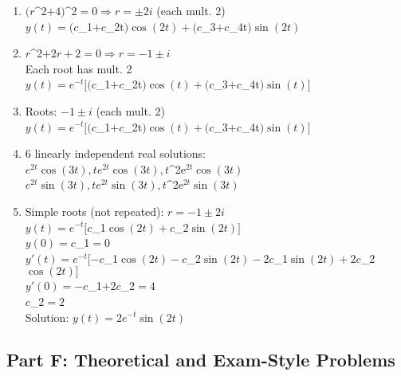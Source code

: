 \documentclass[12pt]{article}
\begin{document}
\begin{enumerate}[resume]
\item $(r$^{2}$ + 4)$^{2}$ = 0 \Rightarrow r = \pm 2i$ (each mult. 2)\\
$y(t) = (c$_{1}$ + c$_{2t}$)\cos(2t) + (c$_{3}$ + c$_{4t}$)\sin(2t)$

\item $r$^{2}$ + 2r + 2 = 0 \Rightarrow r = -1 \pm i$\\
Each root has mult. 2\\
$y(t) = e^{-t}[(c$_{1}$ + c$_{2t}$)\cos(t) + (c$_{3}$ + c$_{4t}$)\sin(t)]$

\item Roots: $-1 \pm i$ (each mult. 2)\\
$y(t) = e^{-t}[(c$_{1}$ + c$_{2t}$)\cos(t) + (c$_{3}$ + c$_{4t}$)\sin(t)]$

\item 6 linearly independent real solutions:\\
$e^{2t}\cos(3t), te^{2t}\cos(3t), t$^{2e}$^{2t}\cos(3t)$\\
$e^{2t}\sin(3t), te^{2t}\sin(3t), t$^{2e}$^{2t}\sin(3t)$

\item Simple roots (not repeated): $r = -1 \pm 2i$\\
$y(t) = e^{-t}[c$_{1}$\cos(2t) + c$_{2}$\sin(2t)]$\\
$y(0) = c$_{1}$ = 0$\\
$y'(t) = e^{-t}[-c$_{1}$\cos(2t) - c$_{2}$\sin(2t) - 2c$_{1}$\sin(2t) + 2c$_{2}$\cos(2t)]$\\
$y'(0) = -c$_{1}$ + 2c$_{2}$ = 4$\\
$c$_{2}$ = 2$\\
Solution: $y(t) = 2e^{-t}\sin(2t)$
\end{enumerate}

\subsection*{Part F: Theoretical and Exam-Style Problems}
\end{document}
